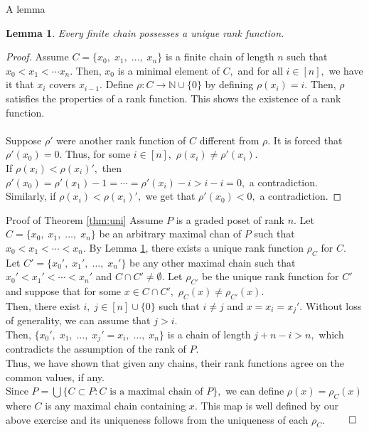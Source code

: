 \documentclass[handout, aspectratio=169]{beamer}
\newtheorem{lem}{Lemma}
\begin{document}
\begin{frame}{A lemma}
	\begin{lem}\label{lem:unichain}
		Every finite chain possesses a unique rank function.
	\end{lem}
	\begin{proof}
		Assume $C = \{x_0,\;x_1,\;\ldots,\;x_n\}$ is a finite chain of length $n$ such that $x_0 < x_1 < \cdots x_n.$ Then, $x_0$ is a minimal element of $C,$ and for all $i \in [n],$ we have it that $x_i$ covers $x_{i-1}.$ Define $\rho:C \to \mathbb{N}\cup\{0\}$ by defining $\rho(x_i) = i.$ Then, $\rho$ satisfies the properties of a rank function. This shows the existence of a rank function.\\~\\
		Suppose $\rho'$ were another rank function of $C$ different from $\rho.$ It is forced that $\rho'(x_0) = 0.$ Thus, for some $i \in [n],$ $\rho(x_i) \neq \rho'(x_i).$\\
		If $\rho(x_i) < \rho(x_i)',$ then $\rho'(x_0) = \rho'(x_1) - 1 = \cdots = \rho'(x_i) - i > i - i = 0,$ a contradiction.\\
		Similarly, if $\rho(x_i) < \rho(x_i)',$ we get that $\rho'(x_0) < 0,$ a contradiction.
	\end{proof}
\end{frame}
\begin{frame}{Proof of Theorem \ref{thm:uni}}
	Assume $P$ is a graded poset of rank $n.$ Let $C = \{x_0,\;x_1,\;\ldots,\;x_n\}$ be an arbitrary maximal chan of $P$ such that $x_0 < x_1 < \cdots < x_n.$ By Lemma \ref{lem:unichain}, there exists a unique rank function $\rho_C$ for $C.$\\
	Let $C' = \{x_0',\;x_1',\;\ldots,\;x_n'\}$ be any other maximal chain such that $x_0' < x_1' < \cdots < x_n'$ and $C \cap C' \neq \emptyset.$ Let $\rho_{C'}$ be the unique rank function for $C'$ and suppose that for some $x \in C \cap C',$ $\rho_C(x) \neq \rho_{C'}(x).$\\
	Then, there exist $i,\;j \in [n]\cup\{0\}$ such that $i \neq j$ and $x = x_i = x_j'.$ Without loss of generality, we can assume that $j > i.$\\
	Then, $\{x_0',\; x_1,\;\ldots,\;x_j' = x_i,\;\ldots,\;x_n\}$ is a chain of length $j + n - i > n,$ which contradicts the assumption of the rank of $P.$\\
	Thus, we have shown that given any chains, their rank functions agree on the common values, if any.\\
	Since $P = \bigcup\{C \subset P : C \text{ is a maximal chain of }P\},$ we can define $\rho(x) = \rho_C(x)$ where $C$ is any maximal chain containing $x.$ This map is well defined by our above exercise and its uniqueness follows from the uniqueness of each $\rho_C.$ \hfill $\qed$
\end{frame}
\end{document}
